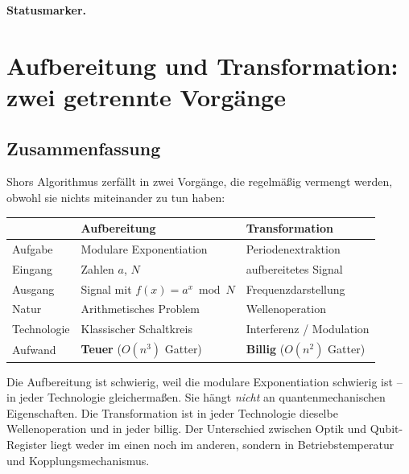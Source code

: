 
\medskip\noindent\textbf{Statusmarker.}


\section{Aufbereitung und Transformation: zwei getrennte Vorgänge}

\subsection*{Zusammenfassung}

Shors Algorithmus zerfällt in zwei Vorgänge, die regelmäßig vermengt
werden, obwohl sie nichts miteinander zu tun haben:

\begin{center}
\begin{tabular}{lll}
\toprule
 & \textbf{Aufbereitung} & \textbf{Transformation} \\
\midrule
Aufgabe & Modulare Exponentiation & Periodenextraktion \\
Eingang & Zahlen $a$, $N$ & aufbereitetes Signal \\
Ausgang & Signal mit $f(x) = a^x \bmod N$ & Frequenzdarstellung \\
Natur & Arithmetisches Problem & Wellenoperation \\
Technologie & Klassischer Schaltkreis & Interferenz / Modulation \\
Aufwand & \textbf{Teuer} ($O(n^3)$ Gatter) & \textbf{Billig} ($O(n^2)$ Gatter) \\
\bottomrule
\end{tabular}
\end{center}

Die Aufbereitung ist schwierig, weil die modulare Exponentiation
schwierig ist -- in jeder Technologie gleichermaßen. Sie hängt
\emph{nicht} an quantenmechanischen Eigenschaften. Die Transformation
ist in jeder Technologie dieselbe Wellenoperation und in jeder billig.
Der Unterschied zwischen Optik und Qubit-Register liegt weder im einen
noch im anderen, sondern in Betriebstemperatur und
Kopplungsmechanismus.

